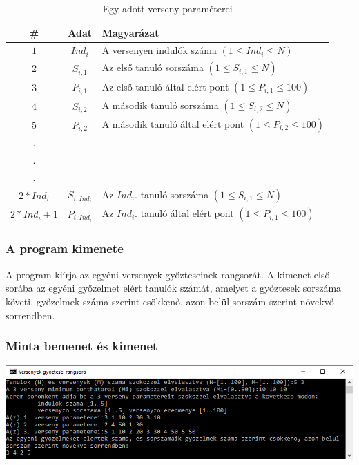 \documentclass[a4paper]{article}
\begin{document}
        \begin{table}[H]
          \centering
          \caption{Egy adott verseny paraméterei}
          \label{tab:table2}
          \begin{tabular}{ccl}
            \toprule
            \# & Adat & Magyarázat \\
            \midrule
            $1$ & $Ind_i$ & A versenyen indulók száma $(1 \leqslant Ind_i \leqslant N)$ \\
            $2$ & $S_{i,1}$ & Az első tanuló sorszáma $(1 \leqslant S_{i,1} \leqslant N)$ \\
            $3$ & $P_{i,1}$ & Az első tanuló által elért pont $(1 \leqslant P_{i,1} \leqslant 100)$ \\
            $4$ & $S_{i,2}$ & A második tanuló sorszáma $(1 \leqslant S_{i,2} \leqslant N)$ \\
            $5$ & $P_{i,2}$ & A második tanuló által elért pont $(1 \leqslant P_{i,2} \leqslant 100)$ \\
            . \\
            . \\
            . \\
            $2*Ind_i$ & $S_{i,Ind_i}$ & Az $Ind_i$. tanuló sorszáma $(1 \leqslant S_{i,1} \leqslant N)$ \\
            $2*Ind_i+1$ & $P_{i,Ind_i}$ & Az $Ind_i$. tanuló által elért pont $(1 \leqslant P_{i,1} \leqslant 100)$ \\
            \bottomrule
          \end{tabular}
        \end{table}
      \subsubsection{A program kimenete}
        A program kiírja az egyéni versenyek győzteseinek rangsorát.
        A kimenet első sorába az egyéni győzelmet elért tanulók számát,
        amelyet a győztesek sorszáma követi, győzelmek száma szerint csökkenő,
        azon belül sorszám szerint növekvő sorrendben.
      \subsubsection{Minta bemenet és kimenet}
        \includegraphics[width=\textwidth]{felhJo.PNG}
\end{document}
